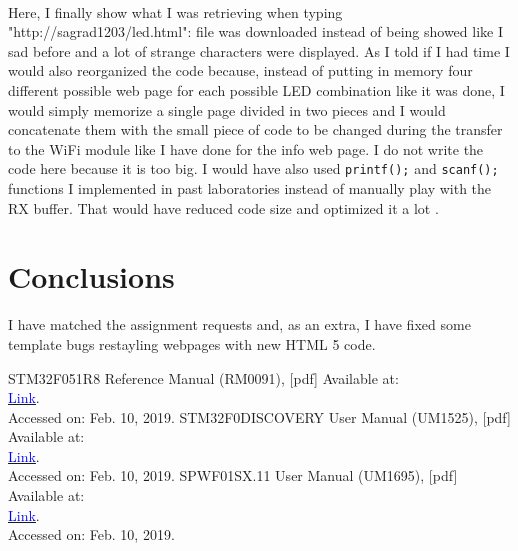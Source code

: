 \documentclass[peerreview]{IEEEtran}
\begin{document}
\\Here, I finally show what I was retrieving when typing "http://sagrad1203/led.html": file was downloaded instead of being showed like I sad before and a lot of strange characters were displayed.
As I told if I had time I would also reorganized the code because, instead of putting in memory four different possible web page for each possible LED combination like it was done, I would simply memorize a single page divided in two pieces and I would concatenate them with the small piece of code to be changed during the transfer to the WiFi module like I have done for the info web page. I do not write the code here because it is too big. I would have also used \lstinline[style=CStyle]{printf();} and \lstinline[style=CStyle]{scanf();} functions I implemented in past laboratories instead of manually play with the RX buffer. That would have reduced code size and optimized it a lot .
\label{tab:template}

\section{Conclusions}
I have matched the assignment requests and, as an extra, I have fixed some template bugs restayling webpages with new HTML 5 code.

\begin{thebibliography}{1}
STM32F051R8 Reference Manual (RM0091), [pdf] Available at:\\ \href{https://www.st.com/content/ccc/resource/technical/document/reference_manual/c2/f8/8a/f2/18/e6/43/96/DM00031936.pdf/files/DM00031936.pdf/jcr:content/translations/en.DM00031936.pdf}{\underline{\textcolor{blue}{Link}}}.\\Accessed on: Feb. 10, 2019.
STM32F0DISCOVERY User Manual (UM1525), [pdf] Available at:\\ \href{https://www.st.com/content/ccc/resource/technical/document/user_manual/30/ae/6e/54/d3/b6/46/17/DM00050135.pdf/files/DM00050135.pdf/jcr:content/translations/en.DM00050135.pdf}{\underline{\textcolor{blue}{Link}}}.\\Accessed on: Feb. 10, 2019.
SPWF01SX.11 User Manual (UM1695), [pdf] Available at:\\ \href{https://www.st.com/content/ccc/resource/technical/document/user_manual/4e/4d/c3/82/43/f1/4c/24/DM00100306.pdf/files/DM00100306.pdf/jcr:content/translations/en.DM00100306.pdf}{\underline{\textcolor{blue}{Link}}}.\\Accessed on: Feb. 10, 2019.
\end{thebibliography}
\end{document}
